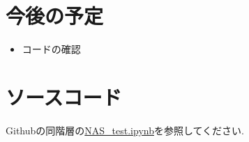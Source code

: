 \documentclass[twocolumn]{jarticle}     %
\begin{document}

\section{今後の予定}
\begin{itemize}
  \item コードの確認
\end{itemize}

\section{ソースコード}
Githubの同階層の\url{NAS_test.ipynb}を参照してください.



\end{document}
